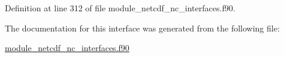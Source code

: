 Definition at line 312 of file module\+\_\+netcdf\+\_\+nc\+\_\+interfaces.\+f90.



The documentation for this interface was generated from the following file\+:\begin{DoxyCompactItemize}
\item 
\hyperlink{module__netcdf__nc__interfaces_8f90}{module\+\_\+netcdf\+\_\+nc\+\_\+interfaces.\+f90}\end{DoxyCompactItemize}
